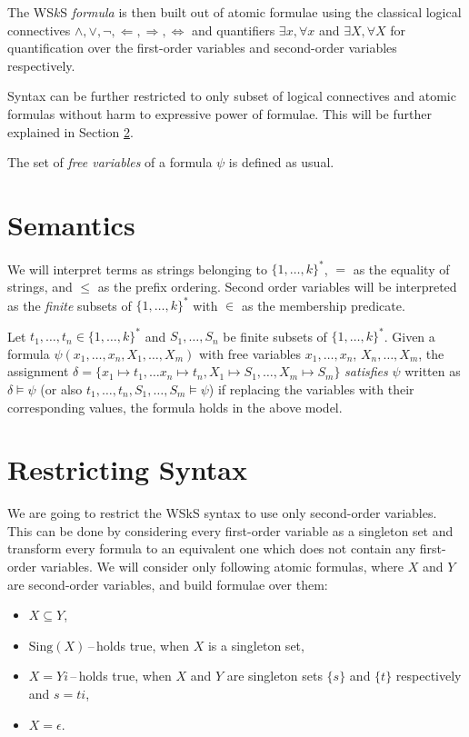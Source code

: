 The WS$k$S \emph{formula} is then built out of atomic formulae using the classical logical connectives $\wedge, \vee, \neg, \Leftarrow, \Rightarrow, \Leftrightarrow$ and quantifiers $\exists x, \forall x$ and $\exists X, \forall X$ for quantification over the first-order variables and second-order variables respectively.

Syntax can be further restricted to only subset of logical connectives and atomic formulas without harm to expressive power of formulae. This will be further explained in Section \ref{restricted}.

The set of \emph{free variables} of a formula $\psi$ is defined as usual.
  
  \section{Semantics}
	
	We will interpret terms as strings belonging to $\{1,\ldots,k\}^*$, $=$ as the equality of strings, and $\leq$ as the prefix ordering. Second order variables will be interpreted as the \emph{finite} subsets of $\{1,\ldots,k\}^*$ with $\in$ as the membership predicate.
	
	Let $t_1,\ldots,t_n \in \{1,\ldots,k\}^*$ and $S_1,\ldots,S_n$ be finite subsets of $\{1,\ldots,k\}^*$. Given a formula $\psi(x_1,\ldots,x_n,X_1,\ldots,X_m)$ with free variables $x_1,\ldots,x_n$, $X_n,\ldots,X_m$, the assignment $\delta = \{ x_1 \mapsto t_1,\ldots x_n \mapsto t_n, X_1 \mapsto S_1,\ldots, X_m \mapsto S_m\}$ \emph{satisfies} $\psi$ written as $\delta \vDash \psi$ (or also $t_1,\ldots, t_n, S_1,\ldots,S_m \vDash \psi$) if replacing the variables with their corresponding values, the formula holds in the above model.
	
  \section{Restricting Syntax}\label{restricted}
	We are going to restrict the WSkS syntax to use only second-order variables. This can be done by considering every first-order variable as a singleton set and transform every formula to an equivalent one which does not contain any first-order variables. We will consider only following atomic formulas, where $X$ and $Y$ are second-order variables, and build formulae over them:
	\begin{itemize}
	 \item $X \subseteq Y$,
	 \item $\text{Sing}(X)$\,--\,holds true, when $X$ is a singleton set,
	 \item $X = Yi$\,--\,holds true, when $X$ and $Y$ are singleton sets $\{s\}$ and $\{t\}$ respectively and $s = ti$,
	 \item $X = \epsilon$.
	\end{itemize}
	
